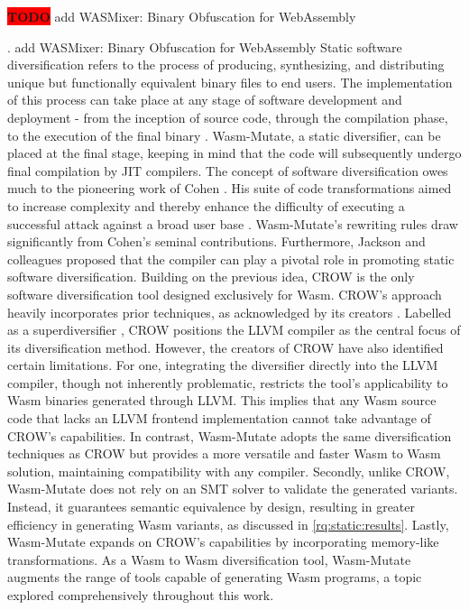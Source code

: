 \documentclass[sigplan,screen]{acmart}
\newcommand*\badge[1]{ \colorbox{red}{\color{white}#1}}
\newcommand{\tool}{{\sc Wasm-Mutate}\xspace}
\newcommand{\wasm}{Wasm\xspace}
\newcommand{\todo}[1]{%
\refstepcounter{todo}
\noindent\textbf{\badge{TODO}} {\color{red}#1}
\addcontentsline{td}{todo}
{\color{red}\thesection.\thetodo\xspace #1}}
\begin{document}
\todo{add WASMixer: Binary Obfuscation for WebAssembly}
Static software diversification refers to the process of producing, synthesizing, and distributing unique but functionally equivalent binary files to end users. 
The implementation of this process can take place at any stage of software development and deployment - from the inception of source code, through the compilation phase, to the execution of the final binary \cite{jackson2011compiler, lundquist2016searching}.
\tool, a static diversifier, can be placed at the final stage, keeping in mind that the code will subsequently undergo final compilation by JIT compilers.
The concept of software diversification owes much to the pioneering work of Cohen \cite{cohen1993operating}. 
His suite of code transformations aimed to increase complexity and thereby enhance the difficulty of executing a successful attack against a broad user base \cite{cohen1993operating}. 
\tool's rewriting rules draw significantly from Cohen's seminal contributions.
Furthermore, Jackson and colleagues \cite{jackson2011compiler} proposed that the compiler can play a pivotal role in promoting static software diversification. 
Building on the previous idea, CROW is the only software diversification tool designed exclusively for \wasm. 
CROW's approach heavily incorporates prior techniques, as acknowledged by its creators \cite{arteaga2020crow}. 
Labelled as a superdiversifier \cite{jacob2008superdiversifier}, CROW positions the LLVM compiler as the central focus of its diversification method. 
However, the creators of CROW have also identified certain limitations.
For one, integrating the diversifier directly into the LLVM compiler, though not inherently problematic, restricts the tool's applicability to \wasm binaries generated through LLVM. 
This implies that any \wasm source code that lacks an LLVM frontend implementation cannot take advantage of CROW's capabilities.
In contrast, \tool adopts the same diversification techniques as CROW but provides a more versatile and faster \wasm to \wasm solution, maintaining compatibility with any compiler. 
Secondly, unlike CROW, \tool does not rely on an SMT solver to validate the generated variants. 
Instead, it guarantees semantic equivalence by design, resulting in greater efficiency in generating \wasm variants, as discussed in \autoref{rq:static:results}.
Lastly, \tool expands on CROW's capabilities by incorporating memory-like transformations. 
As a \wasm to \wasm diversification tool, \tool augments the range of tools capable of generating \wasm programs, a topic explored comprehensively throughout this work.
\end{document}
